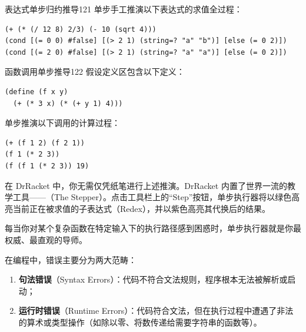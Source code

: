 \begin{exercise}{表达式单步归约推导}{121}
单步手工推演以下表达式的求值全过程：
\begin{lstlisting}[language=BSL]
(+ (* (/ 12 8) 2/3) (- 10 (sqrt 4)))
(cond [(= 0 0) #false] [(> 2 1) (string=? "a" "b")] [else (= 0 2)])
(cond [(= 2 0) #false] [(> 2 1) (string=? "a" "a")] [else (= 0 2)])
\end{lstlisting}
\end{exercise}

\begin{exercise}{函数调用单步推导}{122}
假设定义区包含以下定义：
\begin{lstlisting}[language=BSL]
(define (f x y)
  (+ (* 3 x) (* (+ y 1) 4)))
\end{lstlisting}
单步推演以下调用的计算过程：
\begin{lstlisting}[language=BSL]
(+ (f 1 2) (f 2 1))
(f 1 (* 2 3))
(f (f 1 (* 2 3)) 19)
\end{lstlisting}
\end{exercise}

\label{sec:int01_computing}

在 DrRacket 中，你无需仅凭纸笔进行上述推演。DrRacket 内置了世界一流的教学工具——（The Stepper）。点击工具栏上的“Step”按钮，单步执行器将以绿色高亮当前正在被求值的子表达式（Redex），并以紫色高亮其代换后的结果。

每当你对某个复杂函数在特定输入下的执行路径感到困惑时，单步执行器就是你最权威、最直观的导师。

\label{sec:int01_errors}

在编程中，错误主要分为两大范畴：
\begin{enumerate}
  \item \textbf{句法错误}（Syntax Errors）：代码不符合文法规则，程序根本无法被解析或启动；
  \item \textbf{运行时错误}（Runtime Errors）：代码符合文法，但在执行过程中遭遇了非法的算术或类型操作（如除以零、将数传递给需要字符串的函数等）。
\end{enumerate}

\label{sec:int01_boolean_expressions}

